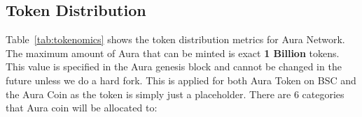 \documentclass[11pt, titlepage]{article}
\begin{document}
\subsection{Token Distribution}
\begin{table}[ht]
\centering
{}
\caption{Aura token distribution design}
\label{tab:tokenomics}
\end{table}

Table~\ref{tab:tokenomics} shows the token distribution metrics for Aura Network. The maximum amount of Aura that can be minted is exact \textbf{1 Billion} tokens. This value is specified in the Aura genesis block and cannot be changed in the future unless we do a hard fork. This is applied for both Aura Token on BSC and the Aura Coin as the token is simply just a placeholder. There are 6 categories that Aura coin will be allocated to:
\end{document}
